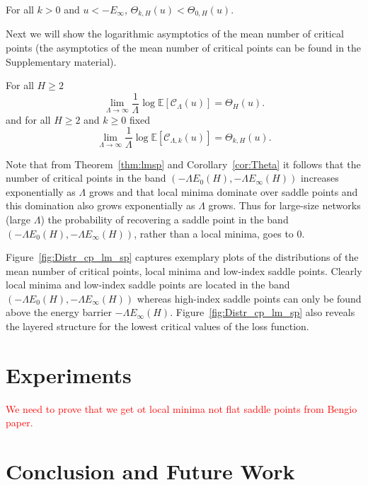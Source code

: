 \documentclass[twoside]{article}
\begin{document}
\begin{corollary}
For all $k > 0$ and $u < -E_{\infty}$, $\Theta_{k,H}(u) < \Theta_{0,H}(u)$.
\label{cor:Theta}
\end{corollary}

Next we will show the logarithmic asymptotics of the mean number of critical points (the asymptotics of the mean number of critical points can be found in the Supplementary material).
\begin{theorem}
For all $H \geq 2$
\[\lim_{\Lambda \rightarrow \infty}\frac{1}{\Lambda}\log\mathbb{E}[\mathcal{C}_{\Lambda}(u)] = \Theta_{H}(u).
\]
and for all $H \geq 2$ and $k \geq 0$ fixed
\[\lim_{\Lambda \rightarrow \infty}\frac{1}{\Lambda}\log\mathbb{E}[\mathcal{C}_{\Lambda,k}(u)] = \Theta_{k,H}(u).
\]
\label{thm:lmsp}
\end{theorem}
Note that from Theorem~\ref{thm:lmsp} and Corollary~\ref{cor:Theta} it follows that the number of critical points in the band $\left(-\Lambda E_0(H),-\Lambda E_{\infty}(H)\right)$ increases exponentially as $\Lambda$ grows and that local minima dominate over saddle points and this domination also grows exponentially as $\Lambda$ grows. Thus for large-size networks (large $\Lambda$) the probability of recovering a saddle point in the band $\left(-\Lambda E_0(H),-\Lambda E_{\infty}(H)\right)$, rather than a local minima, goes to $0$.

Figure~\ref{fig:Distr_cp_lm_sp} captures exemplary plots of the distributions of the mean number of critical points, local minima and low-index saddle points. Clearly local minima and low-index saddle points are located in the band $\left(-\Lambda E_0(H),-\Lambda E_{\infty}(H)\right)$ whereas high-index saddle points can only be found above the energy barrier $-\Lambda E_{\infty}(H)$. Figure~\ref{fig:Distr_cp_lm_sp} also reveals the layered structure for the lowest critical values of the loss function. 

\section{Experiments}
\label{sec:Experiments}

\textcolor{red}{We need to prove that we get ot local minima not flat saddle points from Bengio paper.}

\section{Conclusion and Future Work}
\label{sec:ConandFutWork}
\end{document}

